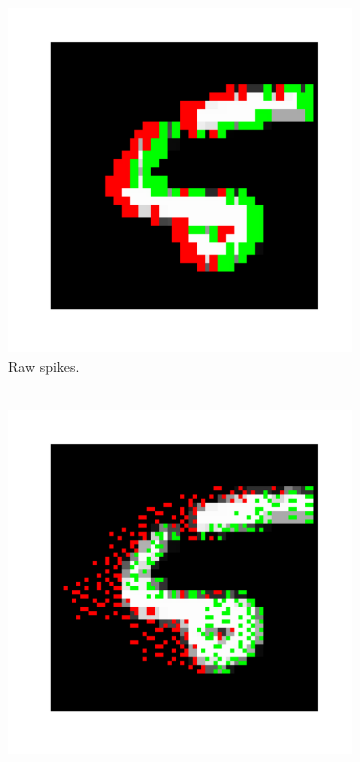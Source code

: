 \documentclass[conference]{IEEEtran}
\begin{document}
\setcounter{figure}{11} %
\begin{figure}[htb]
  \captionsetup[subfigure]{justification=centering}
  \centering
  \begin{subfigure}[b]{0.155\textwidth}
    \includegraphics[width=\textwidth,trim={3cm 2cm 2cm 2cm},clip] {inhibitory_behaviour__NORMAL___cycle_00000___frame_00035_}
    \caption{Raw spikes.\\~}
    \label{fig:pre_inh}
  \end{subfigure}
  \begin{subfigure}[b]{0.155\textwidth}
    \includegraphics[width=\textwidth,trim={3cm 2cm 2cm 2cm},clip] {inhibitory_behaviour__INHIBITED___cycle_00000___frame_00035_}

\end{subfigure}
\end{figure}
\end{document}
